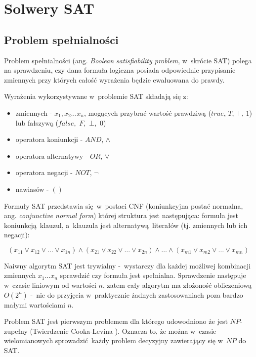 \chapter{Solwery SAT}

\section{Problem spełnialności}
Problem spełnialności (ang. \textit{Boolean satisfiability problem}, w~skrócie SAT) polega na sprawdzeniu, czy dana formuła logiczna
posiada odpowiednie przypisanie zmiennych przy których całość wyrażenia będzie ewaluowana do prawdy.

Wyrażenia wykorzystywane w~problemie SAT składają się z: 
\begin{itemize}
    \item zmiennych - $x_1, x_2 \dots x_n$, mogących przybrać wartość prawdziwą ($true$, $T$, $\top$, $1$) 
    lub fałszywą ($false$,~$F$,~$\bot$,~$0$)
    \item operatora koniunkcji - $AND$, $\land$
    \item operatora alternatywy - $OR$, $\lor$
    \item operatora negacji - $NOT$, $\lnot$
    \item nawiasów - $()$
\end{itemize}

Formuły SAT przedstawia się w~postaci CNF (koniunkcyjna postać normalna, ang. \textit{conjunctive normal form}) 
której struktura jest następująca: formuła jest koniunkcją klauzul, a~klauzula jest alternatywą literałów (tj. zmiennych lub ich negacji):

\[ (x_{11} \lor x_{12} \lor \dots \lor x_{1n} ) \land (x_{21} \lor x_{22} \lor \dots \lor x_{2n} ) \land  \dots \land (x_{m1} \lor x_{m2} \lor \dots \lor x_{mn} ) \]


Naiwny algorytm SAT jest trywialny -~wystarczy dla każdej możliwej kombinacji zmiennych $x_1 \dots x_n$
sprawdzić czy formuła jest spełnialna. Sprawdzenie następuje w~czasie liniowym od wartości $n$, zatem cały algorytm
ma złożoność obliczeniową $O(2^n)$ -~nie do przyjęcia w~praktycznie żadnych zastosowaniach poza bardzo małymi wartościami $n$.

Problem SAT jest pierwszym problemem dla którego udowodniono że jest $NP$-zupełny (Twierdzenie Cooka-Levina \cite{cook-SAT, levin-SAT}).
Oznacza to, że można w~czasie wielomianowych sprowadzić każdy problem decyzyjny zawierający się w~$NP$ do SAT.

